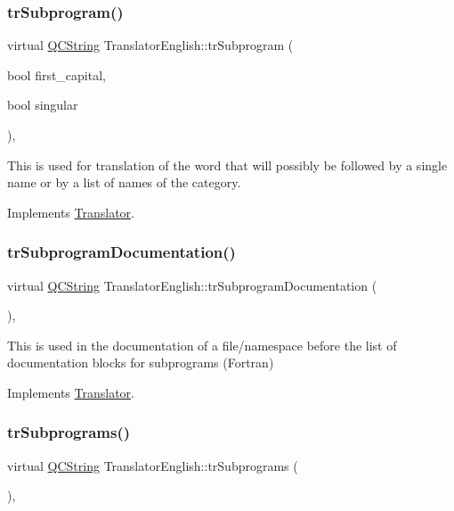 \subsubsection{\texorpdfstring{trSubprogram()}{trSubprogram()}}
{\footnotesize\ttfamily virtual \mbox{\hyperlink{class_q_c_string}{Q\+C\+String}} Translator\+English\+::tr\+Subprogram (\begin{DoxyParamCaption}\item[{bool}]{first\+\_\+capital,  }\item[{bool}]{singular }\end{DoxyParamCaption})\hspace{0.3cm}{\ttfamily [inline]}, {\ttfamily [virtual]}}

This is used for translation of the word that will possibly be followed by a single name or by a list of names of the category. 

Implements \mbox{\hyperlink{class_translator}{Translator}}.

\mbox{\label{class_translator_english_af6aac850498f6a5c31034f1e7ab9cfe3}} 
\subsubsection{\texorpdfstring{trSubprogramDocumentation()}{trSubprogramDocumentation()}}
{\footnotesize\ttfamily virtual \mbox{\hyperlink{class_q_c_string}{Q\+C\+String}} Translator\+English\+::tr\+Subprogram\+Documentation (\begin{DoxyParamCaption}{ }\end{DoxyParamCaption})\hspace{0.3cm}{\ttfamily [inline]}, {\ttfamily [virtual]}}

This is used in the documentation of a file/namespace before the list of documentation blocks for subprograms (Fortran) 

Implements \mbox{\hyperlink{class_translator}{Translator}}.

\mbox{\label{class_translator_english_a854ad98abca1a95e54b132fa44ce31c3}} 
\subsubsection{\texorpdfstring{trSubprograms()}{trSubprograms()}}
{\footnotesize\ttfamily virtual \mbox{\hyperlink{class_q_c_string}{Q\+C\+String}} Translator\+English\+::tr\+Subprograms (\begin{DoxyParamCaption}{ }\end{DoxyParamCaption})\hspace{0.3cm}{\ttfamily [inline]}, {\ttfamily [virtual]}}

